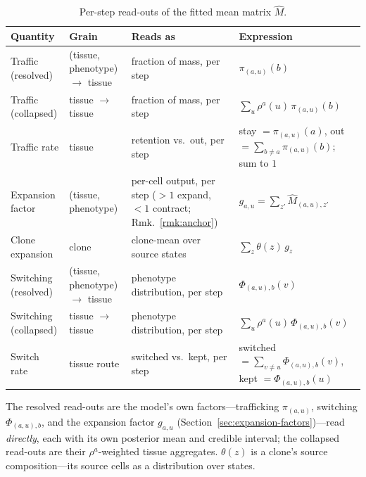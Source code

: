 \documentclass[11pt]{article}
\theoremstyle{definition}
\begin{document}
\begin{table}[h]
\centering
\small
\renewcommand{\arraystretch}{1.4}
\begin{tabular}{@{}p{2.15cm}p{2.35cm}p{3.2cm}p{5.3cm}@{}}
\toprule
\textbf{Quantity} & \textbf{Grain} & \textbf{Reads as} & \textbf{Expression}\\
\midrule
Traffic (resolved)
  & (tissue, phenotype) $\to$ tissue
  & fraction of mass, per step
  & $\pi_{(a,u)}(b)$\\
Traffic (collapsed)
  & tissue $\to$ tissue
  & fraction of mass, per step
  & $\sum_{u}\rho^a(u)\,\pi_{(a,u)}(b)$\\
Traffic rate
  & tissue
  & retention vs.\ out, per step
  & stay $=\pi_{(a,u)}(a)$, out $=\sum_{b\neq a}\pi_{(a,u)}(b)$; sum to $1$\\
Expansion factor
  & (tissue, phenotype)
  & per-cell output, per step ($>1$ expand, $<1$ contract; Rmk.~\ref{rmk:anchor})
  & $g_{a,u}=\sum_{z'}\widehat{M}_{(a,u),z'}$\\
Clone expansion
  & clone
  & clone-mean over source states
  & $\sum_{z}\theta(z)\,g_z$\\
Switching (resolved)
  & (tissue, phenotype) $\to$ tissue
  & phenotype distribution, per step
  & $\Phi_{(a,u),b}(v)$\\
Switching (collapsed)
  & tissue $\to$ tissue
  & phenotype distribution, per step
  & $\sum_{u}\rho^a(u)\,\Phi_{(a,u),b}(v)$\\
Switch rate
  & tissue route
  & switched vs.\ kept, per step
  & switched $=\sum_{v\neq u}\Phi_{(a,u),b}(v)$, kept $=\Phi_{(a,u),b}(u)$\\
\bottomrule
\end{tabular}
\caption{Per-step read-outs of the fitted mean matrix $\widehat{M}$.}
\label{tab:readouts}
\end{table}

The resolved read-outs are the model's own factors---trafficking $\pi_{(a,u)}$,
switching $\Phi_{(a,u),b}$, and the expansion factor $g_{a,u}$
(Section~\ref{sec:expansion-factors})---read \emph{directly}, each with its own
posterior mean and credible interval; the collapsed read-outs are their
$\rho^a$-weighted tissue aggregates. $\theta(z)$ is a clone's source
composition---its source cells as a distribution over states.
\end{document}
